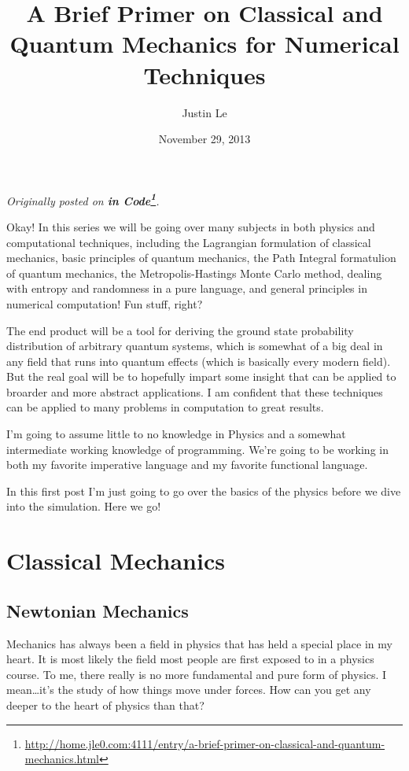 \documentclass[]{article}
\title{A Brief Primer on Classical and Quantum Mechanics for Numerical Techniques}
\author{Justin Le}
\date{November 29, 2013}
\renewcommand{\href}[2]{#2\footnote{\url{#1}}}
\begin{document}
\maketitle

\emph{Originally posted on
\textbf{\href{http://home.jle0.com:4111/entry/a-brief-primer-on-classical-and-quantum-mechanics.html}{in
Code}}.}

Okay! In this series we will be going over many subjects in both physics and computational
techniques, including the Lagrangian formulation of classical mechanics, basic principles of quantum
mechanics, the Path Integral formatulion of quantum mechanics, the Metropolis-Hastings Monte Carlo
method, dealing with entropy and randomness in a pure language, and general principles in numerical
computation! Fun stuff, right?

The end product will be a tool for deriving the ground state probability distribution of arbitrary
quantum systems, which is somewhat of a big deal in any field that runs into quantum effects (which
is basically every modern field). But the real goal will be to hopefully impart some insight that
can be applied to broarder and more abstract applications. I am confident that these techniques can
be applied to many problems in computation to great results.

I'm going to assume little to no knowledge in Physics and a somewhat intermediate working knowledge
of programming. We're going to be working in both my favorite imperative language and my favorite
functional language.

In this first post I'm just going to go over the basics of the physics before we dive into the
simulation. Here we go!

\section{Classical Mechanics}\label{classical-mechanics}

\subsection{Newtonian Mechanics}\label{newtonian-mechanics}

Mechanics has always been a field in physics that has held a special place in my heart. It is most
likely the field most people are first exposed to in a physics course. To me, there really is no
more fundamental and pure form of physics. I mean\ldots{}it's the study of how things move under
forces. How can you get any deeper to the heart of physics than that?
\end{document}
